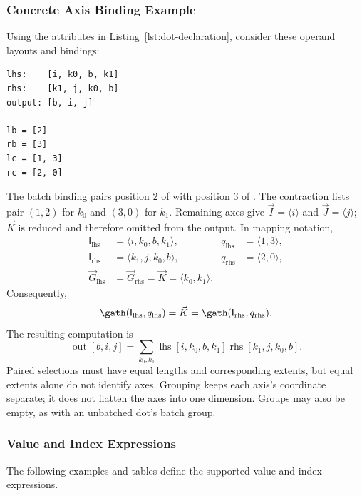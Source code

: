 \subsubsection{Concrete Axis Binding Example}
\label{extended:sec:axis-groups}
Using the attributes in Listing~\ref{lst:dot-declaration}, consider these
operand layouts and bindings:
\begin{lstlisting}
lhs:    [i, k0, b, k1]
rhs:    [k1, j, k0, b]
output: [b, i, j]

lb = [2]
rb = [3]
lc = [1, 3]
rc = [2, 0]
\end{lstlisting}
The batch binding pairs position $2$ of  with position $3$ of
. The contraction lists pair $(1,2)$ for $k_0$ and $(3,0)$ for
$k_1$. Remaining axes give $\vec I=\langle i\rangle$ and $\vec J=\langle j\rangle$;
$\vec K$ is reduced and therefore omitted from the output. In mapping notation,
\begin{equation}
\begin{aligned}
\mathsf{I}_{\mathrm{lhs}}&=\langle i,k_0,b,k_1\rangle,
 &q_{\mathrm{lhs}}&=\langle1,3\rangle,\\
\mathsf{I}_{\mathrm{rhs}}&=\langle k_1,j,k_0,b\rangle,
 &q_{\mathrm{rhs}}&=\langle2,0\rangle,\\
\vec G_{\mathrm{lhs}}&=\vec G_{\mathrm{rhs}}=\vec K=\langle k_0,k_1\rangle.
\end{aligned}
\end{equation}
Consequently,
\begin{equation}
 \gath(\mathsf{I}_{\mathrm{lhs}},q_{\mathrm{lhs}})
 =\vec K=\gath(\mathsf{I}_{\mathrm{rhs}},q_{\mathrm{rhs}}).
\end{equation}
The resulting computation is
\begin{equation}
 \operatorname{out}[b,i,j]
 =\sum_{k_0,k_1}\operatorname{lhs}[i,k_0,b,k_1]
                    \operatorname{rhs}[k_1,j,k_0,b].
\end{equation}
Paired selections must have equal lengths and corresponding extents,
but equal extents alone do not identify axes. Grouping keeps each axis's
coordinate separate; it does not flatten the axes into one dimension.
Groups may also be empty, as with an unbatched dot's batch group.

\subsubsection{Value and Index Expressions}
\label{extended:sec:value-expressions}
\label{sec:value-expressions}
The following examples and tables define the supported value and index expressions.

